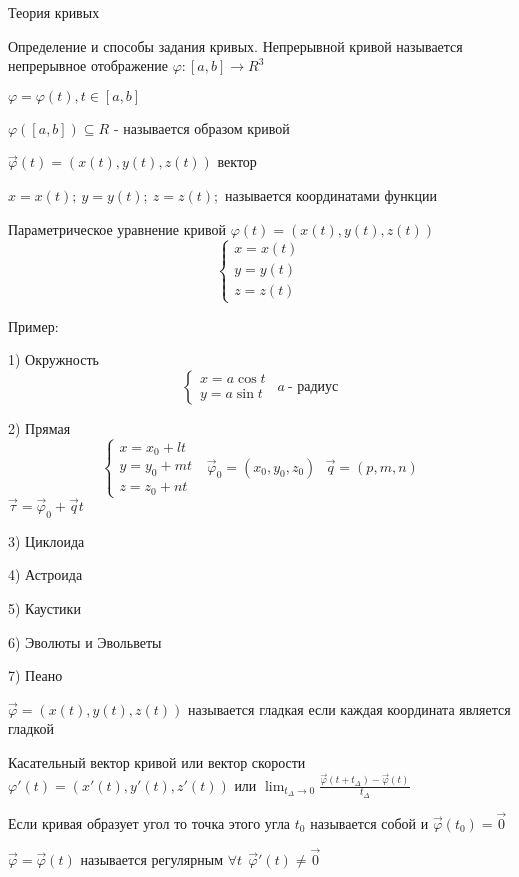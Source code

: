 \begin{title}
    Теория кривых
\end{title}

    Определение и способы задания кривых. Непрерывной кривой называется
непрерывное отображение $\varphi: [a,b] \to R^3$

$\varphi = \varphi (t), t \in [a,b]$

$\varphi ([a,b]) \subseteq R$ - называется образом кривой

$\vec \varphi (t) = ( x(t), y(t), z(t) )$ вектор

$x = x(t); ~ y = y(t); ~ z = z(t);$ называется координатами функции

Параметрическое уравнение кривой $\varphi(t) = ( x(t), y(t), z(t) )$
$$
\left\{
\begin{array}{c}
  x = x(t) \\
  y = y(t) \\
  z = z(t)
\end{array}
\right.
$$

Пример:

1) Окружность
$$
\left\{
\begin{array}{c}
  x = a \cos t \\
  y = a \sin t
\end{array}
\right.
~~ a ~\text{- радиус}
$$

2) Прямая
$$
\left\{
\begin{array}{c}
  x = x_0 + lt \\
  y = y_0 + mt \\
  z = z_0 + nt
\end{array}
\right.
~~~ \vec \varphi_0 = ( x_0, y_0, z_0 )
~~~ \vec q = (p, m, n)
$$
$\vec \tau = \vec \varphi_0 + \vec q t$

3) Циклоида

4) Астроида

5) Каустики

6) Эволюты и Эвольветы

7) Пеано

$\vec \varphi = ( x(t), y(t), z(t) )$ называется гладкая если каждая координата
является гладкой

Касательный вектор кривой или вектор скорости
$\varphi' (t) = ( x'(t), y'(t), z'(t) )$ или $\lim_{ t_{\Delta} \to 0 }
\frac{ \vec \varphi (t + t_{\Delta}) - \vec \varphi (t) }{t_{\Delta}}$

Если кривая образует угол то точка этого угла $t_0$ называется собой и
$\vec \varphi (t_0) = \vec 0$

$\vec \varphi = \vec \varphi (t)$ называется регулярным
$\forall t ~~ \vec \varphi' (t) \not = \vec 0$

